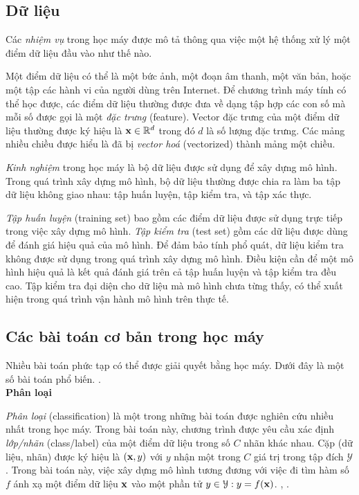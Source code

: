 \subsection{Dữ liệu}
Các \textit{nhiệm vụ} trong học máy được mô tả thông qua việc
một hệ thống xử lý một điểm dữ liệu đầu vào như thế nào.

Một điểm dữ liệu có thể là một bức ảnh, một đoạn âm thanh, một văn bản, hoặc một
tập các hành vi của người dùng trên Internet. Để chương trình máy tính có thể
học được, các điểm dữ liệu thường được đưa về dạng tập hợp các con số mà mỗi số
được gọi là một \textit{đặc trưng} (feature). Vector đặc trưng của một điểm dữ liệu thường được ký hiệu là $\mathbf{x} \in \mathbb{R}^d$ trong đó $d$ là số lượng đặc trưng. Các mảng nhiều chiều được hiểu là đã bị \textit{vector hoá} (vectorized) thành mảng một chiều.

\textit{Kinh nghiệm} trong học máy là bộ dữ liệu được sử dụng để xây
dựng mô hình. Trong quá trình xây dựng mô hình, bộ dữ liệu thường được chia ra
làm ba tập dữ liệu không giao nhau: tập huấn luyện, tập kiểm tra, và tập xác thực.

\textit{Tập huấn luyện} (training set) bao gồm các điểm dữ liệu được sử dụng trực tiếp trong việc xây dựng mô hình. \textit{Tập kiểm tra} (test set) gồm các dữ liệu được dùng để đánh giá hiệu quả của mô hình. Để đảm bảo tính phổ quát, dữ liệu kiểm tra không được sử dụng trong quá trình xây dựng mô hình. Điều kiện cần để một mô hình hiệu quả là kết quả đánh giá trên cả tập huấn luyện và tập kiểm tra đều cao. Tập kiểm tra đại diện cho dữ liệu mà mô hình chưa từng thấy, có thể xuất hiện trong quá trình vận hành mô hình trên thực tế.


\subsection{Các bài toán cơ bản trong học máy}




Nhiều bài toán phức tạp có thể được giải quyết bằng học máy. Dưới đây là một số bài toán phổ biến. \cite{V1}.\\

\textbf{Phân loại}

\textit{Phân loại} (classification) là một trong những bài toán được nghiên cứu nhiều nhất trong học máy. Trong
bài toán này, chương trình được yêu cầu xác định \textit{lớp/nhãn} (class/label) của một điểm dữ liệu trong số $C$ nhãn khác nhau. Cặp (dữ liệu, nhãn) được ký hiệu là $(\mathbf{x}, y)$ với $y$ nhận một trong $C$ giá trị trong tập đích $\mathcal{Y}$.
Trong bài toán này, việc xây dựng mô hình tương đương với việc đi tìm hàm số $f$ ánh xạ một điểm dữ liệu $\mathbf{x}$ vào một phần tử $y \in \mathcal{Y}: y = f(\mathbf{x})$. \cite{V1}, \cite{V2}.

